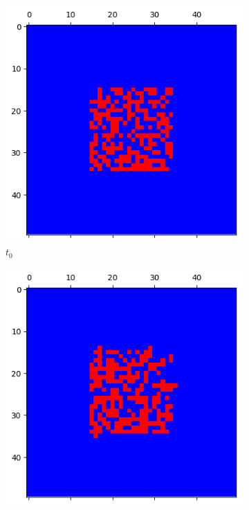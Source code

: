 \documentclass[letterpaper]{article}
\begin{document}
\begin{figure}[H]
    \begin{subfigure}{.33\textwidth}
      \centering
      \includegraphics[width=1\linewidth]{images/assign2/part32-coop/t0}
      \caption{$t_{0}$}
    \end{subfigure}
    \begin{subfigure}{.33\textwidth}
      \centering
      \includegraphics[width=1\linewidth]{images/assign2/part32-coop/t1}

\end{subfigure}
\end{figure}
\end{document}
